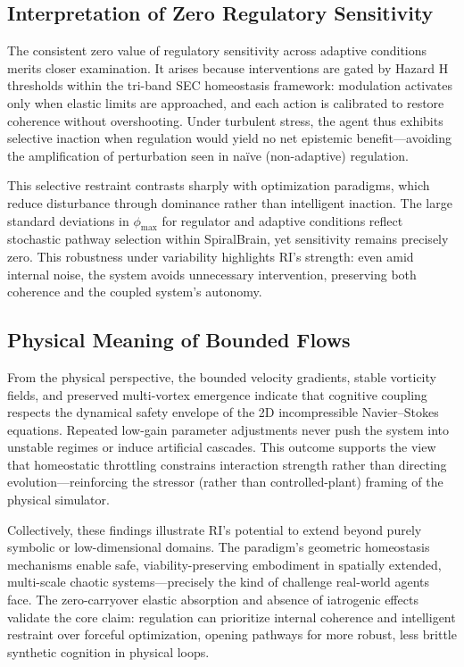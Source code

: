 \documentclass[12pt,a4paper]{article}
\begin{document}
\subsection{Interpretation of Zero Regulatory Sensitivity}

The consistent zero value of regulatory sensitivity across adaptive conditions merits closer examination. It arises because interventions are gated by Hazard H thresholds within the tri-band SEC homeostasis framework: modulation activates only when elastic limits are approached, and each action is calibrated to restore coherence without overshooting. Under turbulent stress, the agent thus exhibits selective inaction when regulation would yield no net epistemic benefit—avoiding the amplification of perturbation seen in naïve (non-adaptive) regulation.

This selective restraint contrasts sharply with optimization paradigms, which reduce disturbance through dominance rather than intelligent inaction. The large standard deviations in $\phi_{\max}$ for regulator and adaptive conditions reflect stochastic pathway selection within SpiralBrain, yet sensitivity remains precisely zero. This robustness under variability highlights RI's strength: even amid internal noise, the system avoids unnecessary intervention, preserving both coherence and the coupled system's autonomy.

\subsection{Physical Meaning of Bounded Flows}

From the physical perspective, the bounded velocity gradients, stable vorticity fields, and preserved multi-vortex emergence indicate that cognitive coupling respects the dynamical safety envelope of the 2D incompressible Navier--Stokes equations. Repeated low-gain parameter adjustments never push the system into unstable regimes or induce artificial cascades. This outcome supports the view that homeostatic throttling constrains interaction strength rather than directing evolution—reinforcing the stressor (rather than controlled-plant) framing of the physical simulator.

Collectively, these findings illustrate RI's potential to extend beyond purely symbolic or low-dimensional domains. The paradigm's geometric homeostasis mechanisms enable safe, viability-preserving embodiment in spatially extended, multi-scale chaotic systems—precisely the kind of challenge real-world agents face. The zero-carryover elastic absorption and absence of iatrogenic effects validate the core claim: regulation can prioritize internal coherence and intelligent restraint over forceful optimization, opening pathways for more robust, less brittle synthetic cognition in physical loops.
\end{document}
